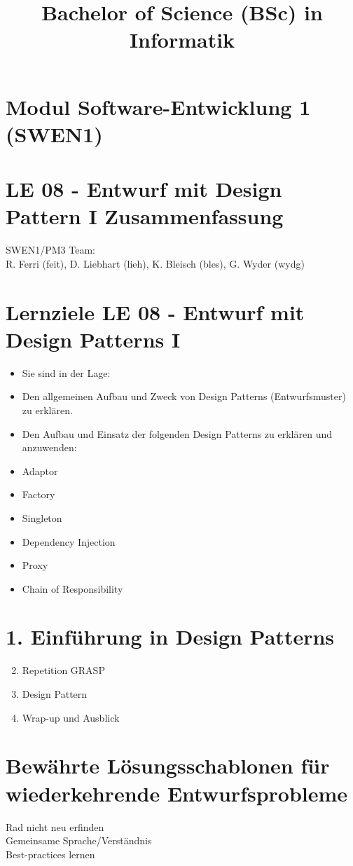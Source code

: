 \documentclass[10pt]{article}
\title{Bachelor of Science (BSc) in Informatik }
\author{}
\date{}
\begin{document}
\maketitle
\section*{Modul Software-Entwicklung 1 (SWEN1) }
\section*{LE 08 - Entwurf mit Design Pattern I Zusammenfassung}
SWEN1/PM3 Team:\\
R. Ferri (feit), D. Liebhart (lieh), K. Bleisch (bles), G. Wyder (wydg)

\section*{Lernziele LE 08 - Entwurf mit Design Patterns I}
\begin{itemize}
  \item Sie sind in der Lage:
  \item Den allgemeinen Aufbau und Zweck von Design Patterns (Entwurfsmuster) zu erklären.
  \item Den Aufbau und Einsatz der folgenden Design Patterns zu erklären und anzuwenden:
  \item Adaptor
  \item Factory
  \item Singleton
  \item Dependency Injection
  \item Proxy
  \item Chain of Responsibility
\end{itemize}

\section*{1. Einführung in Design Patterns}
\begin{enumerate}
  \setcounter{enumi}{1}
  \item Repetition GRASP
  \item Design Pattern
  \item Wrap-up und Ausblick
\end{enumerate}

\section*{Bewährte Lösungsschablonen für wiederkehrende Entwurfsprobleme }
\begin{displayquote}
Rad nicht neu erfinden\\
Gemeinsame Sprache/Verständnis\\
Best-practices lernen
\end{displayquote}
\end{document}
